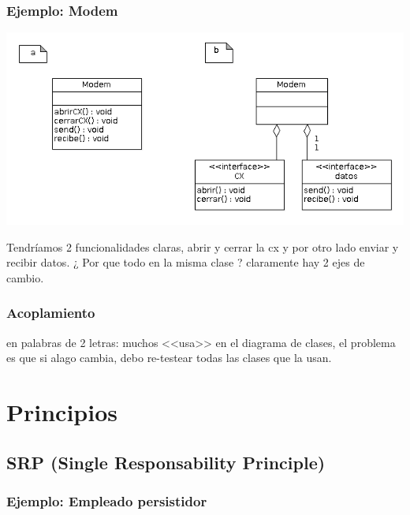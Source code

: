 \documentclass[10pt,a4paper]{article}
\begin{document}
 
\subsubsection{Ejemplo: Modem}
	\includegraphics[scale=0.5]{./img/modem.png} 

	Tendríamos 2 funcionalidades claras, abrir y cerrar la cx 
	y por otro lado enviar y recibir datos.
	¿ Por que todo en la misma clase ? claramente hay 2 ejes de cambio.

\subsubsection{Acoplamiento}
en palabras de 2 letras: muchos <<usa>> en el diagrama de clases, 
el problema es que si alago cambia, debo re-testear todas las clases que la usan.


\section{Principios}

\subsection{SRP (Single Responsability Principle)}

\subsubsection{Ejemplo: Empleado persistidor }
\end{document}
